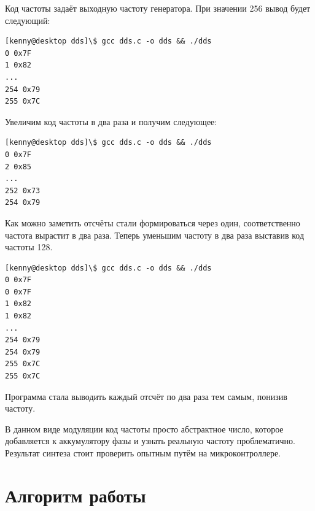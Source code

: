 	Код частоты задаёт выходную частоту генератора. При значении 256 вывод будет следующий:
	
\begin{code}
\begin{verbatim}
[kenny@desktop dds]\$ gcc dds.c -o dds && ./dds
0 0x7F
1 0x82
...
254 0x79
255 0x7C
\end{verbatim}
\end{code}
	
	Увеличим код частоты в два раза и получим следующее:

\begin{code}
\begin{verbatim}
[kenny@desktop dds]\$ gcc dds.c -o dds && ./dds
0 0x7F
2 0x85
...
252 0x73
254 0x79
\end{verbatim}
\end{code}

	Как можно заметить отсчёты стали формироваться через один, соответственно частота вырастит в два раза. Теперь уменьшим частоту в два раза выставив код частоты 128.

\begin{code}
\begin{verbatim}
[kenny@desktop dds]\$ gcc dds.c -o dds && ./dds
0 0x7F
0 0x7F
1 0x82
1 0x82
...
254 0x79
254 0x79
255 0x7C
255 0x7C
\end{verbatim}
\end{code}

	Программа стала выводить каждый отсчёт по два раза тем самым, понизив частоту.
	
	В данном виде модуляции код частоты просто абстрактное число, которое добавляется к аккумулятору фазы и узнать реальную частоту проблематично. Результат синтеза стоит проверить опытным путём на микроконтроллере.

\section{Алгоритм работы}


